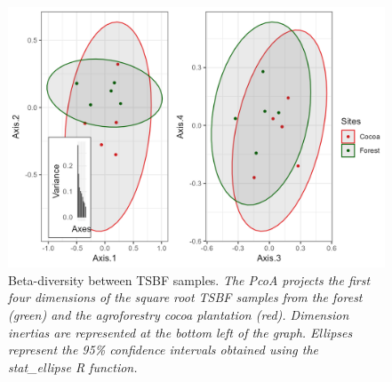 \documentclass[fleqn,10pt]{ArtEcoFoG} %
\begin{document}
\normalsize

\scriptsize

\begin{figure}

{\centering \includegraphics[width=0.8\linewidth,]{rapport_files/figure-latex/betadiv-1} 

}

\caption{Beta-diversity between TSBF samples. \textit{ The PcoA projects the first four dimensions of the square root TSBF samples from the forest (green) and the agroforestry cocoa plantation (red). Dimension inertias are represented at the bottom left of the graph. Ellipses represent the 95\% confidence intervals obtained using the stat_ellipse R function.}}\label{fig:betadiv}
\end{figure}

\normalsize

\scriptsize
\end{document}
